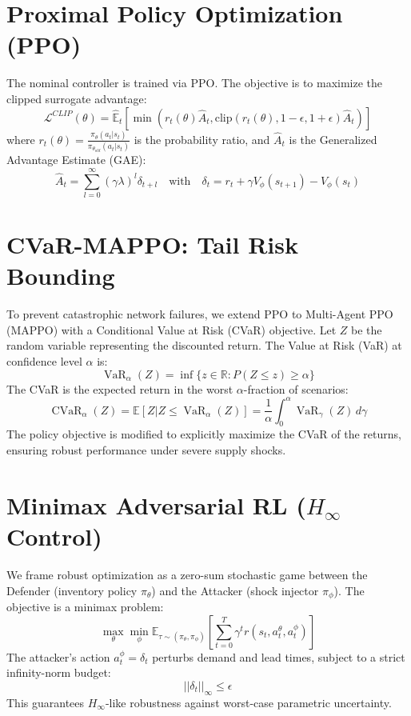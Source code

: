 \documentclass[11pt,a4paper]{article}
\begin{document}
\section{Proximal Policy Optimization (PPO)}
The nominal controller is trained via PPO. The objective is to maximize the clipped surrogate advantage:
\begin{equation}
    \mathcal{L}^{CLIP}(\theta) = \hat{\mathbb{E}}_t \left[ \min(r_t(\theta) \hat{A}_t, \text{clip}(r_t(\theta), 1-\epsilon, 1+\epsilon) \hat{A}_t) \right]
\end{equation}
where $r_t(\theta) = \frac{\pi_\theta(a_t | s_t)}{\pi_{\theta_{old}}(a_t | s_t)}$ is the probability ratio, and $\hat{A}_t$ is the Generalized Advantage Estimate (GAE):
\begin{equation}
    \hat{A}_t = \sum_{l=0}^{\infty} (\gamma \lambda)^l \delta_{t+l} \quad \text{with} \quad \delta_t = r_t + \gamma V_\phi(s_{t+1}) - V_\phi(s_t)
\end{equation}

\section{CVaR-MAPPO: Tail Risk Bounding}
To prevent catastrophic network failures, we extend PPO to Multi-Agent PPO (MAPPO) with a Conditional Value at Risk (CVaR) objective.
Let $Z$ be the random variable representing the discounted return. The Value at Risk (VaR) at confidence level $\alpha$ is:
\begin{equation}
    \operatorname{VaR}_\alpha(Z) = \inf \{ z \in \mathbb{R} : P(Z \leq z) \geq \alpha \}
\end{equation}
The CVaR is the expected return in the worst $\alpha$-fraction of scenarios:
\begin{equation}
    \operatorname{CVaR}_\alpha(Z) = \mathbb{E}[Z | Z \leq \operatorname{VaR}_\alpha(Z)] = \frac{1}{\alpha} \int_0^\alpha \operatorname{VaR}_\gamma(Z) \, d\gamma
\end{equation}
The policy objective is modified to explicitly maximize the CVaR of the returns, ensuring robust performance under severe supply shocks.

\section{Minimax Adversarial RL ($H_\infty$ Control)}
We frame robust optimization as a zero-sum stochastic game between the Defender (inventory policy $\pi_\theta$) and the Attacker (shock injector $\pi_\phi$).
The objective is a minimax problem:
\begin{equation}
    \max_{\theta} \min_{\phi} \mathbb{E}_{\tau \sim (\pi_\theta, \pi_\phi)} \left[ \sum_{t=0}^T \gamma^t r(s_t, a_t^\theta, a_t^\phi) \right]
\end{equation}
The attacker's action $a_t^\phi = \delta_t$ perturbs demand and lead times, subject to a strict infinity-norm budget:
\begin{equation}
    ||\delta_t||_\infty \leq \epsilon
\end{equation}
This guarantees $H_\infty$-like robustness against worst-case parametric uncertainty.
\end{document}
